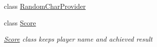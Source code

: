 \begin{DoxyCompactItemize}
class \hyperlink{class_labyrinth_game_1_1_random_char_provider}{Random\+Char\+Provider}
\item 
class \hyperlink{class_labyrinth_game_1_1_score}{Score}
\begin{DoxyCompactList}\small\item\em \hyperlink{class_labyrinth_game_1_1_score}{Score} class keeps player name and achieved result \end{DoxyCompactList}\end{DoxyCompactItemize}
